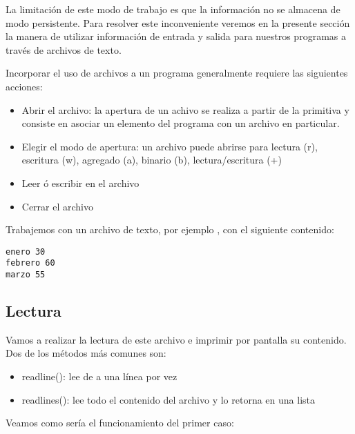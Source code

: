 \documentclass[a4paper,12pt,spanish]{sphinxmanual}
\begin{document}
La limitación de este modo de trabajo es que la información no se
almacena de modo persistente. Para resolver este inconveniente veremos
en la presente sección la manera de utilizar información de entrada y
salida para nuestros programas a través de archivos de texto.

Incorporar el uso de archivos a un programa generalmente requiere las
siguientes acciones:
\begin{itemize}
\item {} 
Abrir el archivo: la apertura de un achivo se realiza a partir de la
primitiva  y consiste en asociar un elemento del programa con
un archivo en particular.

\item {} 
Elegir el modo de apertura: un archivo puede abrirse para lectura
(r), escritura (w), agregado (a), binario (b), lectura/escritura (+)

\item {} 
Leer ó escribir en el archivo

\item {} 
Cerrar el archivo

\end{itemize}

Trabajemos con un archivo de texto, por ejemplo , con el
siguiente contenido:

\begin{Verbatim}[commandchars=\\\{\}]
enero 30
febrero 60
marzo 55
\end{Verbatim}


\subsection{Lectura}
\label{Unidad04:lectura}
Vamos a realizar la lectura de este archivo e imprimir por pantalla su
contenido. Dos de los métodos más comunes son:
\begin{itemize}
\item {} 
readline(): lee de a una línea por vez

\item {} 
readlines(): lee todo el contenido del archivo y lo retorna en una
lista

\end{itemize}

Veamos como sería el funcionamiento del primer caso:
\end{document}
